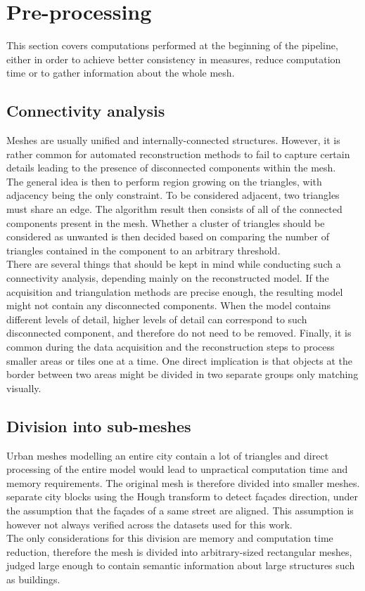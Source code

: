 \documentclass{kththesis}
\begin{document}
\section{Pre-processing} \label{sec:preproc}
This section covers computations performed at the beginning of the pipeline, either in order to achieve better consistency in measures, reduce computation time or to gather information about the whole mesh. 
\subsection{Connectivity analysis}
Meshes are usually unified and internally-connected structures. However, it is rather common for automated reconstruction methods to fail to capture certain details leading to the presence of disconnected components within the mesh. \\ 
The general idea is then to perform region growing on the triangles, with adjacency being the only constraint. To be considered adjacent, two triangles must share an edge. The algorithm result then consists of all of the connected components present in the mesh. Whether a cluster of triangles should be considered as unwanted is then decided based on comparing the number of triangles contained in the component to an arbitrary threshold. \\
There are several things that should be kept in mind while conducting such a connectivity analysis, depending mainly on the reconstructed model. If the acquisition and triangulation methods are precise enough, the resulting model might not contain any disconnected components. When the model contains different levels of detail, higher levels of detail can correspond to such disconnected component, and therefore do not need to be removed. Finally, it is common during the data acquisition and the reconstruction steps to process smaller areas or tiles one at a time. One direct implication is that objects at the border between two areas might be divided in two separate groups only matching visually. 
\subsection{Division into sub-meshes}
Urban meshes modelling an entire city contain a lot of triangles and direct processing of the entire model would lead to unpractical computation time and memory requirements. The original mesh is therefore divided into smaller meshes.  \textcite{HernandezArtefacts} separate city blocks using the Hough transform to detect façades direction, under the assumption that the façades of a same street are aligned. This assumption is however not always verified across the datasets used for this work. \\
The only considerations for this division are memory and computation time reduction, therefore the mesh is divided into arbitrary-sized rectangular meshes, judged large enough to contain semantic information about large structures such as buildings. 
\end{document}
